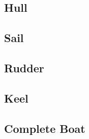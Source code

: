 
\subsection{Hull}


\subsection{Sail}


\subsection{Rudder}


\subsection{Keel}


\subsection{Complete Boat}

